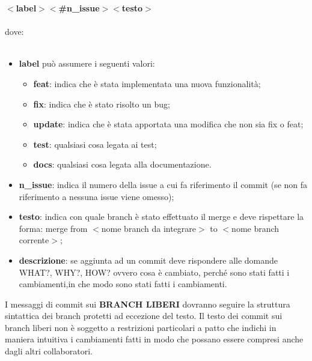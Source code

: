 \textbf{$<$label$>$$<$\#n\_issue$>$$<$testo$>$}\\\\
dove:\\\\
\begin{itemize}
\item \textbf{label} può assumere i seguenti valori:
	\begin{itemize}
	\item \textbf{feat}: indica che è stata implementata una nuova funzionalità;
	\item \textbf{fix}: indica che è stato risolto un bug;
	\item \textbf{update}: indica che è stata apportata una modifica che non sia fix o feat;
	\item \textbf{test}: qualsiasi cosa legata ai test;
	\item \textbf{docs}: qualsiasi cosa legata alla documentazione.
	\end{itemize}
\item \textbf{n\_issue}: indica il numero della issue a cui fa riferimento il commit (se non fa riferimento a nessuna issue viene omesso);
\item \textbf{testo}: indica con quale branch è stato effettuato il merge e deve rispettare la forma: merge from $<$nome branch da integrare$>$ to $<$nome branch corrente$>$;
\item \textbf{descrizione}: se aggiunta ad un commit deve rispondere alle domande WHAT?, WHY?, HOW? ovvero
cosa è cambiato, perché sono stati fatti i cambiamenti,in che modo sono stati fatti i cambiamenti.\\
\end{itemize}
I messaggi di commit sui \textbf{\uppercase{branch liberi}} dovranno seguire la struttura sintattica dei branch protetti ad eccezione del testo.
Il testo dei commit sui branch liberi non è soggetto a restrizioni particolari a patto che indichi in maniera intuitiva i cambiamenti fatti
in modo che possano essere compresi anche dagli altri collaboratori.



